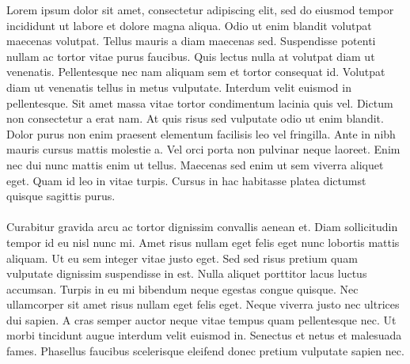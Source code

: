 \documentclass[
						a4paper,									 %
						9.5pt,											%
]{article}																%
\begin{document}
Lorem ipsum dolor sit amet, consectetur adipiscing elit, sed do eiusmod
tempor incididunt ut labore et dolore magna aliqua. Odio ut enim blandit
volutpat maecenas volutpat. Tellus mauris a diam maecenas sed. Suspendisse
potenti nullam ac tortor vitae purus faucibus. Quis lectus nulla at volutpat
diam ut venenatis. Pellentesque nec nam aliquam sem et tortor consequat id.
Volutpat diam ut venenatis tellus in metus vulputate. Interdum velit euismod
in pellentesque. Sit amet massa vitae tortor condimentum lacinia quis vel.
Dictum non consectetur a erat nam. At quis risus sed vulputate odio ut enim
blandit. Dolor purus non enim praesent elementum facilisis leo vel
fringilla. Ante in nibh mauris cursus mattis molestie a. Vel orci porta non
pulvinar neque laoreet. Enim nec dui nunc mattis enim ut tellus. Maecenas
sed enim ut sem viverra aliquet eget. Quam id leo in vitae turpis. Cursus in
hac habitasse platea dictumst quisque sagittis purus. 
\\
\\
Curabitur gravida arcu ac tortor dignissim convallis aenean et. Diam
sollicitudin tempor id eu nisl nunc mi. Amet risus nullam eget felis eget
nunc lobortis mattis aliquam. Ut eu sem integer vitae justo eget. Sed sed
risus pretium quam vulputate dignissim suspendisse in est. Nulla aliquet
porttitor lacus luctus accumsan. Turpis in eu mi bibendum neque egestas
congue quisque. Nec ullamcorper sit amet risus nullam eget felis eget. Neque
viverra justo nec ultrices dui sapien. A cras semper auctor neque vitae
tempus quam pellentesque nec. Ut morbi tincidunt augue interdum velit
euismod in. Senectus et netus et malesuada fames. Phasellus faucibus
scelerisque eleifend donec pretium vulputate sapien nec. \autocite[S. 55]{baurSaechtlingKunststoffTaschenbuch2013}















\cleardoublepage %

\renewcommand{\bibname}{Literaturverzeichnis}
\printbibliography

\end{document}
